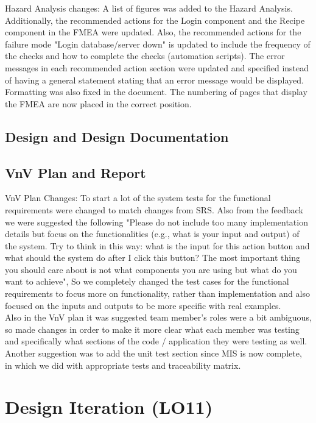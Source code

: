 \documentclass{article}
\begin{document}
Hazard Analysis changes: A list of figures was added to the Hazard Analysis. Additionally, the recommended actions for the Login component and the Recipe component in the FMEA were updated. Also, the recommended actions for the failure mode "Login database/server down" is updated to include the frequency of the checks and how to complete the checks (automation scripts). The error messages in each recommended action section were updated and specified instead of having a general statement stating that an error message would be displayed. Formatting was also fixed in the document. The numbering of pages that display the FMEA are now placed in the correct position. 

\subsection{Design and Design Documentation}

\subsection{VnV Plan and Report}

VnV Plan Changes: To start a lot of the system tests for the functional requirements were changed to match changes from SRS. Also from the feedback we were suggested the following "Please do not include too many implementation details but focus on the functionalities (e.g., what is your input and output) of the system. Try to think in this way: what is the input for this action button and what should the system do after I click this button? The most important thing you should care about is not what components you are using but what do you want to achieve", So we completely changed the test cases for the functional requirements to focus more on functionality, rather than implementation and also focused on the inputs and outputs to be more specific with real examples. \\

Also in the VnV plan it was suggested team member's roles were a bit ambiguous, so made changes in order to make it more clear what each member was testing and specifically what sections of the code / application they were testing as well. Another suggestion was to add the unit test section since MIS is now complete, in which we did with appropriate tests and traceability matrix.

\section{Design Iteration (LO11)}
\end{document}
